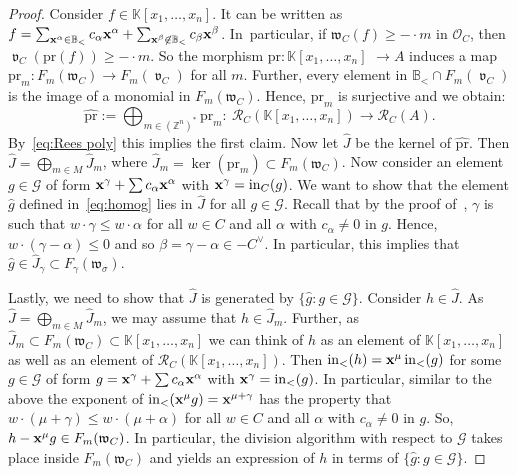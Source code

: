 \documentclass[pdftex]{sigma}%
\numberwithin{equation}{section}
\DeclareMathOperator{\init}{in}
\DeclareMathOperator{\val}{\mathfrak v}
\begin{document}
\begin{proof}
Consider $f\in \mathbb K[x_1,\dots,x_n]$.
It can be written as $f=\sum_{{\bf x}^\alpha\in \mathbb B_<} c_\alpha {\bf x}^\alpha+\sum_{{\bf x}^\beta\not\in \mathbb B_<} c_\beta {\bf x}^\beta$.
In~par\-ti\-cular, if $\mathfrak w_C(f)\ge -\cdot m$ in $\mathcal O_C$, then $\val_C(\text{pr}(f))\ge -\cdot m$.
So the morphism $\text{pr}\colon \mathbb K[x_1,\dots,x_n]$ $\to A$ induces a map $\text{pr}_m\colon F_m(\mathfrak w_C)\to F_m(\val_C)$ for all $m$.
Further, every element in $\mathbb B_<\cap F_m(\val_C)$ is the image of a monomial in $F_m(\mathfrak w_C)$.
Hence, $\text{pr}_m$ is surjective and we obtain:
\begin{displaymath}
\widehat{\text{pr}}:=\bigoplus_{m\in (\mathbb Z^n)^*} \text{pr}_m\colon\
\mathcal R_C(\mathbb K[x_1,\dots,x_n])\to \mathcal R_C(A).
\end{displaymath}
By~\eqref{eq:Rees poly} this implies the first claim.
Now let $\hat J$ be the kernel of $\widehat{\text{pr}}$.
Then $\hat J=\bigoplus_{m\in M} \hat J_m $, where $\hat J_m=\ker(\text{pr}_m)\subset F_m(\mathfrak w_C)$.
Now consider an element $g\in \mathcal G$ of form ${\bf x}^\gamma+\sum c_\alpha{\bf x}^\alpha$ with ${\bf x}^\gamma=\init_C(g)$.
We want to show that the element $\hat g$ defined in~\eqref{eq:homog} lies in $\hat J$ for all $g\in \mathcal G$.
Recall that by the proof of~\thref{prop:special fibers}, $\gamma$ is such that $w\cdot \gamma \le w\cdot \alpha $ for all $w\in C$ and all $\alpha$ with $c_\alpha\not =0$ in $g$.
Hence, $ w\cdot (\gamma-\alpha) \le 0$ and so $\beta=\gamma-\alpha\in -C^\vee$.
In particular, this implies that $\hat g\in \hat J_\gamma\subset F_\gamma(\mathfrak w_\sigma)$.

Lastly, we need to show that $\hat J$ is generated by $\{\hat g\colon g\in \mathcal G\}$.
Consider $h\in \hat J$.
As $\hat J=\bigoplus_{m\in M} \hat J_m$, we may assume that $h\in \hat J_m$.
Further, as $\hat J_m\subset F_m(\mathfrak w_C)\subset \mathbb K[x_1,\dots,x_n]$ we can think of $h$ as an element of $\mathbb K[x_1,\dots,x_n]$ as well as an element of $\mathcal R_C(\mathbb K[x_1,\dots,x_n])$.
Then $\init_<(h)={\bf x}^\mu \init_<(g)$ for some $g\in \mathcal G$ of form $g={\bf x}^\gamma+\sum c_\alpha{\bf x}^\alpha$ with ${\bf x}^\gamma=\init_<(g)$.
In particular, similar to the above the exponent of $\init_<({\bf x}^\mu g)={\bf x}^{\mu+\gamma}$ has the property that $w\cdot (\mu+\gamma) \le w\cdot (\mu+\alpha)$ for all $w\in C$ and all $\alpha$ with $c_\alpha\not =0$ in $g$.
So, $h-{\bf x}^{\mu} g\in F_m(\mathfrak w_C)$. %
In particular, the division algorithm with respect to $\mathcal G$ takes place inside $F_m(\mathfrak w_C)$ and yields an expression of $h$ in terms of $\{\hat g\colon g\in \mathcal G \}$.
\end{proof}
\end{document}
